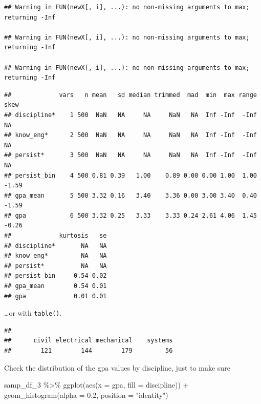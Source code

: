 \documentclass[
]{book}
\newenvironment{Shaded}{\begin{snugshade}}{\end{snugshade}}
\newcommand{\AttributeTok}[1]{\textcolor[rgb]{0.77,0.63,0.00}{#1}}
\newcommand{\FloatTok}[1]{\textcolor[rgb]{0.00,0.00,0.81}{#1}}
\newcommand{\FunctionTok}[1]{\textcolor[rgb]{0.00,0.00,0.00}{#1}}
\newcommand{\NormalTok}[1]{#1}
\newcommand{\SpecialCharTok}[1]{\textcolor[rgb]{0.00,0.00,0.00}{#1}}
\newcommand{\StringTok}[1]{\textcolor[rgb]{0.31,0.60,0.02}{#1}}
\begin{document}
\begin{verbatim}
## Warning in FUN(newX[, i], ...): no non-missing arguments to max; returning -Inf

## Warning in FUN(newX[, i], ...): no non-missing arguments to max; returning -Inf

## Warning in FUN(newX[, i], ...): no non-missing arguments to max; returning -Inf
\end{verbatim}

\begin{verbatim}
##             vars   n mean   sd median trimmed  mad  min  max range  skew
## discipline*    1 500  NaN   NA     NA     NaN   NA  Inf -Inf  -Inf    NA
## know_eng*      2 500  NaN   NA     NA     NaN   NA  Inf -Inf  -Inf    NA
## persist*       3 500  NaN   NA     NA     NaN   NA  Inf -Inf  -Inf    NA
## persist_bin    4 500 0.81 0.39   1.00    0.89 0.00 0.00 1.00  1.00 -1.59
## gpa_mean       5 500 3.32 0.16   3.40    3.36 0.00 3.00 3.40  0.40 -1.59
## gpa            6 500 3.32 0.25   3.33    3.33 0.24 2.61 4.06  1.45 -0.26
##             kurtosis   se
## discipline*       NA   NA
## know_eng*         NA   NA
## persist*          NA   NA
## persist_bin     0.54 0.02
## gpa_mean        0.54 0.01
## gpa             0.01 0.01
\end{verbatim}

\ldots or with \texttt{table()}.

\begin{Shaded}
\end{Shaded}

\begin{verbatim}
## 
##      civil electrical mechanical    systems 
##        121        144        179         56
\end{verbatim}

Check the distribution of the gpa values by discipline, just to make sure

\begin{Shaded}
\begin{Highlighting}[]
\NormalTok{samp\_df\_3 }\SpecialCharTok{\%\textgreater{}\%} 
  \FunctionTok{ggplot}\NormalTok{(}\FunctionTok{aes}\NormalTok{(}\AttributeTok{x =}\NormalTok{ gpa, }\AttributeTok{fill =}\NormalTok{ discipline)) }\SpecialCharTok{+}
  \FunctionTok{geom\_histogram}\NormalTok{(}\AttributeTok{alpha =} \FloatTok{0.2}\NormalTok{, }\AttributeTok{position =} \StringTok{"identity"}\NormalTok{)}
\end{Highlighting}
\end{Shaded}
\end{document}

